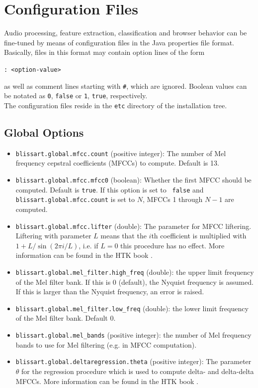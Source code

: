 \section{Configuration Files}

\label{section:ConfigFiles}

Audio processing, feature extraction, classification and browser behavior can be
fine-tuned by means of configuration files in the Java properties file
format. Basically, files in this format may contain option lines of the form

\centerline{\tt <option-name>: <option-value>}

as well as comment lines starting with {\tt \#}, which are ignored. Boolean
values can be notated as {\tt 0}, {\tt false} or {\tt 1}, {\tt true},
respectively.\\

The configuration files reside in the {\tt etc} directory of the installation
tree.


\subsection{Global Options}
\label{section:ConfigFileGlobal}

\begin{itemize}
  \item   {\tt blissart.global.mfcc.count} (positive integer): The number of
    Mel frequency cepstral coefficients (MFCCs) to compute. Default is 13.
  \item   {\tt blissart.global.mfcc.mfcc0} (boolean): Whether the first MFCC
    should be computed. Default is {\tt true}. If this option is set to {\tt
    false} and {\tt blissart.global.mfcc.count} is set to $N$, MFCCs 1 through 
    $N-1$ are computed.
  \item   {\tt blissart.global.mfcc.lifter} (double): The parameter for MFCC
    liftering. Liftering with parameter $L$ means that the $i$th
    coefficient is multiplied with $1 + L / \sin(2\pi i / L)$, i.e. if
    $L=0$ this procedure has no effect. More information can be found in
    the HTK book \cite{HTKBook}.
  \item   {\tt blissart.global.mel\_filter.high\_freq} (double): the upper
    limit frequency of the Mel filter bank. If this is 0 (default), the Nyquist
    frequency is assumed. If this is larger than the Nyquist frequency, an error
    is raised.
  \item   {\tt blissart.global.mel\_filter.low\_freq} (double): the lower limit
    frequency of the Mel filter bank. Default 0.
  \item   {\tt blissart.global.mel\_bands} (positive integer): the number of
    Mel frequency bands to use for Mel filtering (e.g. in MFCC computation).
  \item   {\tt blissart.global.deltaregression.theta} (positive integer): The
    parameter $\theta$ for the regression procedure which is used to
    compute delta- and delta-delta MFCCs. More information can be found in
    the HTK book \cite{HTKBook}.
\end{itemize}


